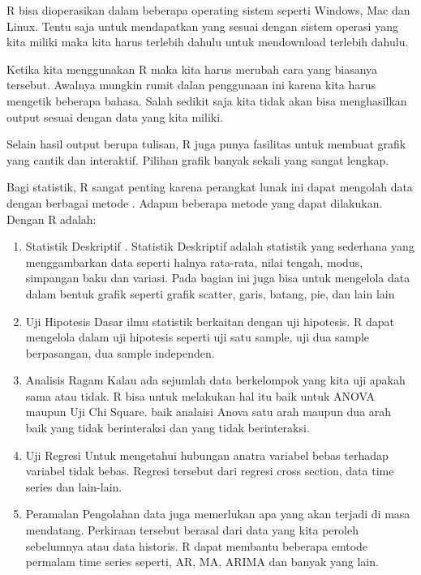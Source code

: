 \documentclass[
]{book}
\theoremstyle{definition}
\theoremstyle{definition}
\theoremstyle{definition}
\theoremstyle{definition}
\theoremstyle{remark}
\begin{document}
R bisa dioperasikan dalam beberapa operating sistem seperti Windows, Mac dan Linux. Tentu saja untuk mendapatkan yang sesuai dengan sistem operasi yang kita miliki maka kita harus terlebih dahulu untuk mendownload terlebih dahulu.

Ketika kita menggunakan R maka kita harus merubah cara yang biasanya tersebut. Awalnya mungkin rumit dalan penggunaan ini karena kita harus mengetik beberapa bahasa. Salah sedikit saja kita tidak akan bisa menghasilkan output sesuai dengan data yang kita miliki.

Selain hasil output berupa tulisan, R juga punya fasilitas untuk membuat grafik yang cantik dan interaktif. Pilihan grafik banyak sekali yang sangat lengkap.

Bagi statistik, R sangat penting karena perangkat lunak ini dapat mengolah data dengan berbagai metode . Adapun beberapa metode yang dapat dilakukan. Dengan R adalah:

\begin{enumerate}
\def\labelenumi{\arabic{enumi}.}
\item
  Statistik Deskriptif .
  Statistik Deskriptif adalah statistik yang sederhana yang menggambarkan data seperti halnya rata-rata, nilai tengah, modus, simpangan baku dan variasi. Pada bagian ini juga bisa untuk mengelola data dalam bentuk grafik seperti grafik scatter, garis, batang, pie, dan lain lain
\item
  Uji Hipotesis
  Dasar ilmu statistik berkaitan dengan uji hipotesis. R dapat mengelola dalam uji hipotesis seperti uji satu sample, uji dua sample berpasangan, dua sample independen.
\item
  Analisis Ragam
  Kalau ada sejumlah data berkelompok yang kita uji apakah sama atau tidak. R bisa untuk melakukan hal itu baik untuk ANOVA maupun Uji Chi Square. baik analaisi Anova satu arah maupun dua arah baik yang tidak berinteraksi dan yang tidak berinteraksi.
\item
  Uji Regresi
  Untuk mengetahui hubungan anatra variabel bebas terhadap variabel tidak bebas. Regresi tersebut dari regresi cross section, data time series dan lain-lain.
\item
  Peramalan
  Pengolahan data juga memerlukan apa yang akan terjadi di masa mendatang. Perkiraan tersebut berasal dari data yang kita peroleh sebelumnya atau data historis. R dapat membantu beberapa emtode permalam time series seperti, AR, MA, ARIMA dan banyak yang lain.
\end{enumerate}
\end{document}

